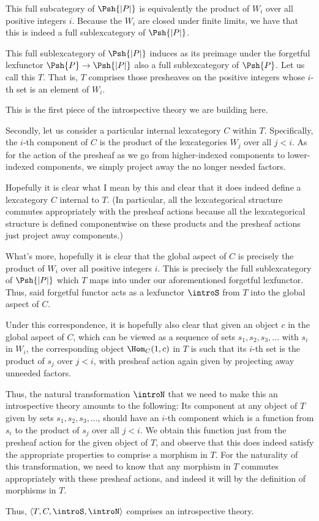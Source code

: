 \begin{construction}
This full subcategory of $\Psh{|P|}$ is equivalently the product of $W_i$ over all positive integers $i$. Because the $W_i$ are closed under finite limits, we have that this is indeed a full sublexcategory of $\Psh{|P|}$.

This full sublexcategory of $\Psh{|P|}$ induces as its preimage under the forgetful lexfunctor $\Psh{P} \to \Psh{|P|}$ also a full sublexcategory of $\Psh{P}$. Let us call this $T$. That is, $T$ comprises those presheaves on the positive integers whose $i$-th set is an element of $W_i$.

This is the first piece of the introspective theory we are building here.

Secondly, let us consider a particular internal lexcategory $C$ within $T$. Specifically, the $i$-th component of $C$ is the product of the lexcategories $W_j$ over all $j < i$. As for the action of the presheaf as we go from higher-indexed components to lower-indexed components, we simply project away the no longer needed factors.

Hopefully it is clear what I mean by this and clear that it does indeed define a lexcategory $C$ internal to $T$. (In particular, all the lexcategorical structure commutes appropriately with the presheaf actions because all the lexcategorical structure is defined componentwise on these products and the presheaf actions just project away components.)

What's more, hopefully it is clear that the global aspect of $C$ is precisely the product of $W_i$ over all positive integers $i$. This is precisely the full sublexcategory of $\Psh{|P|}$ which $T$ maps into under our aforementioned forgetful lexfunctor. Thus, said forgetful functor acts as a lexfunctor $\introS$ from $T$ into the global aspect of $C$.

Under this correspondence, it is hopefully also clear that given an object $c$ in the global aspect of $C$, which can be viewed as a sequence of sets $s_1, s_2, s_3, \ldots$ with $s_i$ in $W_i$, the corresponding object $\Hom_C(1, c)$ in $T$ is such that its $i$-th set is the product of $s_j$ over $j < i$, with presheaf action again given by projecting away unneeded factors.

Thus, the natural transformation $\introN$ that we need to make this an introspective theory amounts to the following: Its component at any object of $T$ given by sets $s_1, s_2, s_3, \ldots$, should have an $i$-th component which is a function from $s_i$ to the product of $s_j$ over all $j < i$. We obtain this function just from the presheaf action for the given object of $T$, and observe that this does indeed satisfy the appropriate properties to comprise a morphism in $T$. For the naturality of this transformation, we need to know that any morphism in $T$ commutes appropriately with these presheaf actions, and indeed it will by the definition of morphisms in $T$.

Thus, $\langle T, C, \introS, \introN \rangle$ comprises an introspective theory.
\end{construction}

